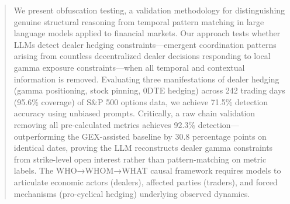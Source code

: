 \documentclass[12pt,letterpaper]{article}
\begin{document}

\begin{abstract}
We present obfuscation testing, a validation methodology for distinguishing genuine structural reasoning from temporal pattern matching in large language models applied to financial markets. Our approach tests whether LLMs detect dealer hedging constraints—emergent coordination patterns arising from countless decentralized dealer decisions responding to local gamma exposure constraints—when all temporal and contextual information is removed. Evaluating three manifestations of dealer hedging (gamma positioning, stock pinning, 0DTE hedging) across 242 trading days (95.6\% coverage) of S\&P 500 options data, we achieve 71.5\% detection accuracy using unbiased prompts. Critically, a raw chain validation removing all pre-calculated metrics achieves 92.3\% detection—outperforming the GEX-assisted baseline by 30.8 percentage points on identical dates, proving the LLM reconstructs dealer gamma constraints from strike-level open interest rather than pattern-matching on metric labels. The WHO→WHOM→WHAT causal framework requires models to articulate economic actors (dealers), affected parties (traders), and forced mechanisms (pro-cyclical hedging) underlying observed dynamics.


\end{abstract}
\end{document}
